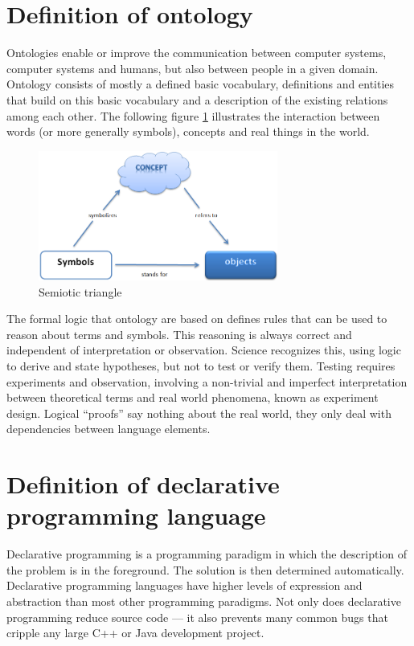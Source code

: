 \section{Definition of ontology}\label{sec:app:ontology}
\par
Ontologies enable or improve the communication between computer systems, computer systems and humans, but also between people in a given domain. Ontology consists of mostly a defined basic vocabulary, definitions and entities that build on this basic vocabulary and a description of the existing relations among each other. The following figure \ref{fig:semiotic_triangle} illustrates the interaction between words (or more generally symbols), concepts and real things in the world. \autocite{appendix:ontology}
\begin{figure}[h]
	\centering
	\includegraphics[width=0.7\textwidth]{pics/appendix/onto.png}
	\caption{Semiotic triangle \label{fig:semiotic_triangle}}	
\end{figure}
\par
The formal logic that ontology are based on defines rules that can be used to reason about terms and symbols. This reasoning is always correct and independent of interpretation or observation. Science recognizes this, using logic to derive and state hypotheses, but not to test or verify them. Testing requires experiments and observation, involving a non-trivial and imperfect interpretation between theoretical terms and real world phenomena, known as experiment design. Logical “proofs” say nothing about the real world, they only deal with dependencies between language elements. \autocite{appendix:ontology}

\section{Definition of declarative programming language}
\par
Declarative programming is a programming paradigm in which the description of the problem is in the foreground. The solution is then determined automatically. Declarative programming languages have higher levels of expression and abstraction than most other programming paradigms. Not only does declarative programming reduce source code — it also prevents many common bugs that cripple any large C++ or Java development project. \autocite{appendix:hawkins} 

